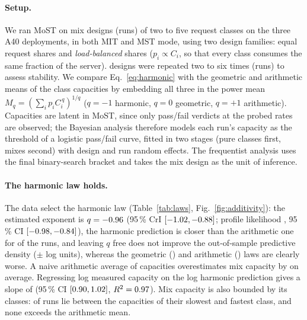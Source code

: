 \paragraph{Setup.} We ran MoST on \scaleNDesigns mix designs (\scaleNMixRuns runs) of two to five request
classes on the three A40 deployments, in both MIT and MST mode, using two design families: equal
request shares and \emph{load-balanced} shares ($p_i \propto C_i$, so that every class consumes the
same fraction of the server). \scaleNRepeatDesigns designs were repeated two to six times
(\scaleNRepeatRuns runs) to assess stability. We compare Eq.~\eqref{eq:harmonic} with the geometric and
arithmetic means of the class capacities by embedding all three in the power mean
$M_q = (\sum_i p_i C_i^{\,q})^{1/q}$ ($q=-1$ harmonic, $q=0$ geometric, $q=+1$ arithmetic). Capacities
are latent in MoST, since only pass/fail verdicts at the probed rates are observed; the Bayesian
analysis therefore models each run's capacity as the threshold of a logistic pass/fail curve, fitted
in two stages (pure classes first, mixes second) with design and run random effects. The frequentist
analysis uses the final binary-search bracket and takes the mix design as the unit of inference.

\paragraph{The harmonic law holds.} The data select the harmonic law (Table~\ref{tab:laws},
Fig.~\ref{fig:additivity}): the estimated exponent is $q=-0.96$ (95\,\% CrI
$[-1.02, -0.88]$; profile likelihood \scaleQHatFreq, 95\,\% CI
$[-0.98, -0.84]$), the harmonic prediction is closer than the arithmetic one for
\scaleHarmonicWinShare of the runs, and leaving $q$ free does not improve the out-of-sample predictive
density (\scalePredFree $\pm$ \scalePredFreeSE log units), whereas the geometric (\scalePredGeom) and
arithmetic (\scalePredArith) laws are clearly worse. A naive arithmetic average of capacities
overestimates mix capacity by \scaleArithMeanErr on average. Regressing log measured capacity on the
log harmonic prediction gives a slope of \scaleCalibSlope (95\,\% CI $[0.90,
1.02]$, $R^2=0.97$). Mix capacity is also bounded by its classes:
\scaleBoundsIn of \scaleBoundsN runs lie between the capacities of their slowest and fastest class,
and none exceeds the arithmetic mean.

